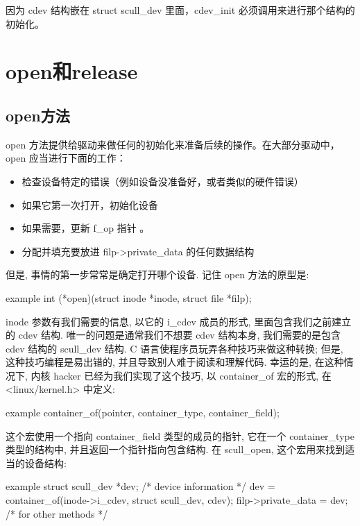 \documentclass[lang=cn,newtx,10pt,scheme=chinese]{elegantbook}
\begin{document}
因为 cdev 结构嵌在 struct scull\_dev 里面，cdev\_init 必须调用来进行那个结构的初始化。

\section{open和release}

\subsection{open方法}

open 方法提供给驱动来做任何的初始化来准备后续的操作。在大部分驱动中，open 应当进行下面的工作：

\begin{itemize}
\item 检查设备特定的错误（例如设备没准备好，或者类似的硬件错误）
\item 如果它第一次打开，初始化设备
\item 如果需要，更新 f\_op 指针 。
\item 分配并填充要放进 filp->private\_data 的任何数据结构
\end{itemize}

但是, 事情的第一步常常是确定打开哪个设备. 记住 open 方法的原型是:

\begin{mycode}{example}
    int (*open)(struct inode *inode, struct file *filp);
\end{mycode}

inode 参数有我们需要的信息, 以它的 i\_cdev 成员的形式, 里面包含我们之前建立的 cdev 结构. 唯一的问题是通常我们不想要 cdev 结构本身, 我们需要的是包含 cdev 结构的 scull\_dev 结构. C 语言使程序员玩弄各种技巧来做这种转换; 但是, 这种技巧编程是易出错的, 并且导致别人难于阅读和理解代码. 幸运的是, 在这种情况下, 内核 hacker 已经为我们实现了这个技巧, 以
container\_of 宏的形式, 在 <linux/kernel.h> 中定义:

\begin{mycode}{example}
    container_of(pointer, container_type, container_field);
\end{mycode}

这个宏使用一个指向 container\_field 类型的成员的指针, 它在一个 container\_type 类型的结构中, 并且返回一个指针指向包含结构. 在 scull\_open, 这个宏用来找到适当的设备结构:

\begin{mycode}{example}
    struct scull_dev *dev; /* device information */
    dev = container_of(inode->i_cdev, struct scull_dev, cdev);
    filp->private_data = dev; /* for other methods */
\end{mycode}
\end{document}
